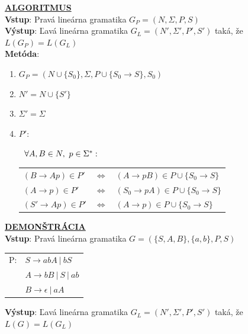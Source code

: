 \documentclass[11pt,a4paper]{article}
\begin{document}
\underline{\textbf{\large{ALGORITMUS}}}\\[0.3em]
\textbf{Vstup}: Pravá lineárna gramatika $G_P = (N,\Sigma,P,S)$\\
\textbf{Výstup}: Ľavá lineárna gramatika $G_L = (N',\Sigma',P',S')$ taká, že $L(G_P)=L(G_L)$\\
\textbf{Metóda}:\\[-2em]
\begin{center}
\begin{minipage}{0.9\textwidth}
\begin{enumerate}[1.)]
    \item $G_P = (N \cup \{S_0\},\Sigma,P \cup \{S_0 \rightarrow S\},S_0)$\\[-2em]
    \item $N' = N \cup \{S'\}$\\[-2em]
    \item $\Sigma' = \Sigma$\\[-2em]
    \item $P'$:\\[-3.275em]
    \begin{center}
    \begin{minipage}{0.85\textwidth}
            $\hspace{0.6em}\forall A,B \in N,\  p \in \Sigma^*:$\\
        \begin{tabular}{lcl}
            $(B  \rightarrow Ap) \in P'$ & $\Longleftrightarrow$ & $(A   \rightarrow pB) \in P \cup \{S_0 \rightarrow S\}$\\
            $(A  \rightarrow p ) \in P'$ & $\Longleftrightarrow$ & $(S_0 \rightarrow pA) \in P \cup \{S_0 \rightarrow S\}$\\
            $(S' \rightarrow Ap) \in P'$ & $\Longleftrightarrow$ & $(A   \rightarrow p ) \in P \cup \{S_0 \rightarrow S\}$\\
        \end{tabular}
    \end{minipage}
    \end{center}
\end{enumerate}
\end{minipage}
\end{center}

\hfill

\underline{\textbf{\large{DEMONŠTRÁCIA}}}\\[0.3em]
\textbf{Vstup}: Pravá lineárna gramatika $G = (\{S,A,B\}, \{a, b\}, P, S)$\\[-1.25em]
\begin{center}
\begin{tabular}{ll}
P:&$S \rightarrow abA\ |\ bS$\\
&$A \rightarrow bB\ |\ S\ |\ ab$\\
&$B \rightarrow \epsilon\ |\ aA$\\
\end{tabular}
\end{center}
\textbf{Výstup}: Ľavá lineárna gramatika $G_L = (N',\Sigma',P',S')$ taká, že $L(G)=L(G_L)$\\
\end{document}
